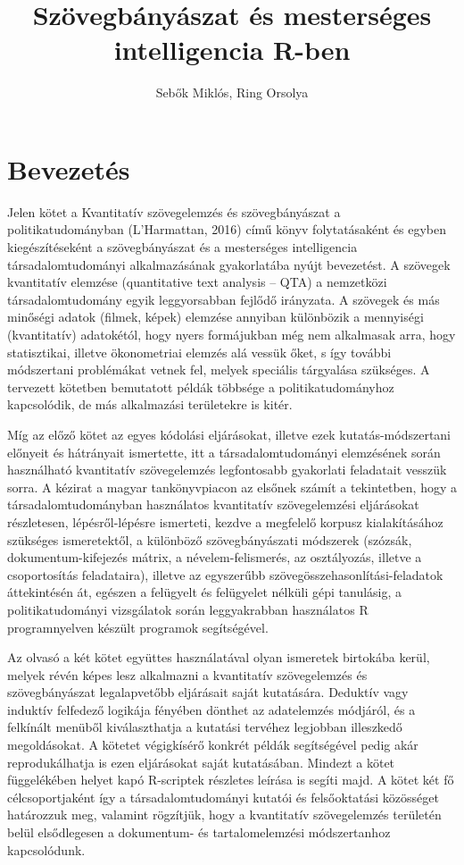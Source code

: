 \documentclass[
]{book}
\title{Szövegbányászat és mesterséges intelligencia R-ben}
\author{Sebők Miklós, Ring Orsolya}
\date{}
\begin{document}
\frontmatter
\maketitle

\mainmatter
\hypertarget{bevezetuxe9s}{%
\chapter{Bevezetés}\label{bevezetuxe9s}}

Jelen kötet a Kvantitatív szövegelemzés és szövegbányászat a
politikatudományban (L'Harmattan, 2016) című könyv folytatásaként és
egyben kiegészítéseként a szövegbányászat és a mesterséges intelligencia
társadalomtudományi alkalmazásának gyakorlatába nyújt bevezetést. A
szövegek kvantitatív elemzése (quantitative text analysis -- QTA) a
nemzetközi társadalomtudomány egyik leggyorsabban fejlődő irányzata. A
szövegek és más minőségi adatok (filmek, képek) elemzése annyiban
különbözik a mennyiségi (kvantitatív) adatokétól, hogy nyers formájukban
még nem alkalmasak arra, hogy statisztikai, illetve ökonometriai elemzés
alá vessük őket, s így további módszertani problémákat vetnek fel,
melyek speciális tárgyalása szükséges. A tervezett kötetben bemutatott
példák többsége a politikatudományhoz kapcsolódik, de más alkalmazási
területekre is kitér.

Míg az előző kötet az egyes kódolási eljárásokat, illetve ezek
kutatás-módszertani előnyeit és hátrányait ismertette, itt a
társadalomtudományi elemzésének során használható kvantitatív
szövegelemzés legfontosabb gyakorlati feladatait vesszük sorra. A
kézirat a magyar tankönyvpiacon az elsőnek számít a tekintetben, hogy a
társadalomtudományban használatos kvantitatív szövegelemzési eljárásokat
részletesen, lépésről-lépésre ismerteti, kezdve a megfelelő korpusz
kialakításához szükséges ismeretektől, a különböző szövegbányászati
módszerek (szózsák, dokumentum-kifejezés mátrix, a névelem-felismerés,
az osztályozás, illetve a csoportosítás feladataira), illetve az
egyszerűbb szövegösszehasonlítási-feladatok áttekintésén át, egészen a
felügyelt és felügyelet nélküli gépi tanulásig, a politikatudományi
vizsgálatok során leggyakrabban használatos R programnyelven készült
programok segítségével.

Az olvasó a két kötet együttes használatával olyan ismeretek birtokába
kerül, melyek révén képes lesz alkalmazni a kvantitatív szövegelemzés és
szövegbányászat legalapvetőbb eljárásait saját kutatására. Deduktív vagy
induktív felfedező logikája fényében dönthet az adatelemzés módjáról, és
a felkínált menüből kiválaszthatja a kutatási tervéhez legjobban
illeszkedő megoldásokat. A kötetet végigkísérő konkrét példák
segítségével pedig akár reprodukálhatja is ezen eljárásokat saját
kutatásában. Mindezt a kötet függelékében helyet kapó R-scriptek
részletes leírása is segíti majd. A kötet két fő célcsoportjaként így a
társadalomtudományi kutatói és felsőoktatási közösséget határozzuk meg,
valamint rögzítjük, hogy a kvantitatív szövegelemzés területén belül
elsődlegesen a dokumentum- és tartalomelemzési módszertanhoz
kapcsolódunk.
\end{document}
